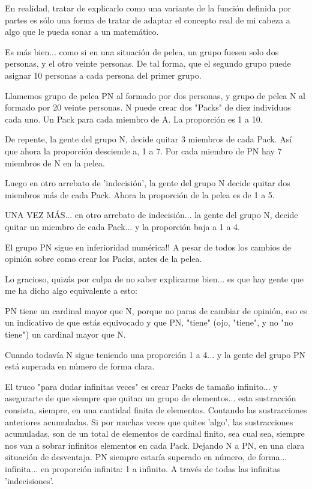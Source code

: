 En realidad, tratar de explicarlo como una variante de la función definida por partes es sólo una forma de tratar de adaptar el concepto real de mi cabeza a algo que le pueda sonar a un matemático.

Es más bien... como si en una situación de pelea, un grupo fuesen solo dos personas, y el otro veinte personas. De tal forma, que el segundo grupo puede asignar 10 personas a cada persona del primer grupo.

Llamemos grupo de pelea PN al formado por dos personas, y grupo de pelea N al formado por 20 veinte personas. N puede crear dos "Packs" de diez individuos cada uno. Un Pack para cada miembro de A. La proporción es 1 a 10.

De repente, la gente del grupo N, decide quitar 3 miembros de cada Pack. Así que ahora la proporción desciende a, 1 a 7. Por cada miembro de PN hay 7 miembros de N en la pelea.

Luego en otro arrebato de 'indecisión', la gente del grupo N decide quitar dos miembros más de cada Pack. Ahora la proporción de la pelea es de 1 a 5.

UNA VEZ MÁS... en otro arrebato de indecisión... la gente del grupo N, decide quitar un miembro de cada Pack... y la proporción baja a 1 a 4.

El grupo PN sigue en inferioridad numérica!! A pesar de todos los cambios de opinión sobre como crear los Packs, antes de la pelea.

Lo gracioso, quizás por culpa de no saber explicarme bien... es que hay gente que me ha dicho algo equivalente a esto:

PN tiene un cardinal mayor que N, porque no paras de cambiar de opinión, eso es un indicativo de que estás equivocado y que PN, "tiene" (ojo, "tiene", y no "no tiene") un cardinal mayor que N.

Cuando todavía N sigue teniendo una proporción 1 a 4... y la gente del grupo PN está superada en número de forma clara.

El truco "para dudar infinitas veces" es crear Packs de tamaño infinito... y asegurarte de que siempre que quitan un grupo de elementos... esta sustracción consista, siempre, en una cantidad finita de elementos. Contando las sustracciones anteriores acumuladas. Si por muchas veces que quites 'algo', las sustracciones acumuladas, son de un total de elementos de cardinal finito, sea cual sea, siempre nos van a sobrar infinitos elementos en cada Pack. Dejando N a PN, en una clara situación de desventaja. PN siempre estaría superado en número, de forma... infinita... en proporción infinita: 1 a infinito. A través de todas las infinitas 'indecisiones'.   

